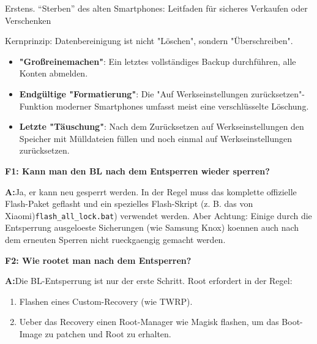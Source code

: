 Erstens. “Sterben” des alten Smartphones: Leitfaden für sicheres Verkaufen oder Verschenken

\begin{tcbinfo}{Kernprinzip: Datenbereinigung ist nicht "Löschen", sondern "Überschreiben".}
\begin{itemize}
  \item \textbf{"Großreinemachen"}: Ein letztes vollständiges Backup durchführen, alle Konten abmelden.
  \item \textbf{Endgültige "Formatierung"}: Die "Auf Werkseinstellungen zurücksetzen"-Funktion moderner Smartphones umfasst meist eine verschlüsselte Löschung.
  \item \textbf{Letzte "Täuschung"}: Nach dem Zurücksetzen auf Werkseinstellungen den Speicher mit Mülldateien füllen und noch einmal auf Werkseinstellungen zurücksetzen.
\end{itemize}

\end{tcbinfo}


\textbf{F1: Kann man den BL nach dem Entsperren wieder sperren?}\par

\textbf{A:}Ja, er kann neu gesperrt werden. In der Regel muss das komplette offizielle Flash-Paket geflasht und ein spezielles Flash-Skript (z. B. das von Xiaomi)\texttt{flash\_all\_lock.\allowbreak bat}) verwendet werden. Aber Achtung: Einige durch die Entsperrung ausgeloeste Sicherungen (wie Samsung Knox) koennen auch nach dem erneuten Sperren nicht rueckgaengig gemacht werden.

\textbf{F2: Wie rootet man nach dem Entsperren?}\par

\textbf{A:}Die BL-Entsperrung ist nur der erste Schritt. Root erfordert in der Regel:

\begin{enumerate}
  \item Flashen eines Custom-Recovery (wie TWRP).
  \item Ueber das Recovery einen Root-Manager wie Magisk flashen, um das Boot-Image zu patchen und Root zu erhalten.
\end{enumerate}
